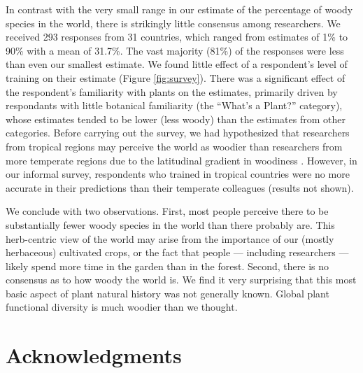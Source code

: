 \documentclass[12pt]{article}
\begin{document}
In contrast with the very small range in our estimate of the
percentage of woody species in the world, there is strikingly little
consensus among researchers.  We received 293 responses from 31
countries, which ranged from estimates of 1\% to 90\% with a mean of
31.7\%.  The vast majority (81\%) of the responses were less than even
our smallest estimate.
We found little effect of a respondent's level of training on their
estimate (Figure \ref{fig:survey}).  There was a significant effect of
the respondent's familiarity with plants on the estimates, primarily
driven by respondants with little botanical familiarity (the ``What's
a Plant?'' category), whose estimates tended to be lower (less
woody) than the estimates from other categories.
% 
Before carrying out the survey, we had hypothesized that researchers
from tropical regions may perceive the world as woodier than
researchers from more temperate regions due to the latitudinal
gradient in woodiness \citep{Molesheihgt}.  However, in our informal
survey, respondents who trained in tropical countries were no more
accurate in their predictions than their temperate colleagues (results
not shown).

We conclude with two observations.
%
First, most people perceive there to be substantially fewer woody
species in the world than there probably are.  This herb-centric view
of the world may arise from the importance of our (mostly herbaceous)
cultivated crops, or the fact that people --- including researchers
--- likely spend more time in the garden than in the forest.
%
Second, there is no consensus as to how woody the world is.  We find
it very surprising that this most basic aspect of plant natural
history was not generally known.  Global plant functional diversity is
much woodier than we thought.

\section{Acknowledgments}
\end{document}
